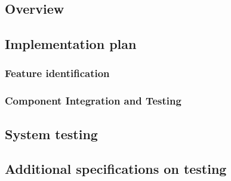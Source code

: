 \subsection{Overview}
\subsection{Implementation plan}
\subsubsection{Feature identification}
\subsubsection{Component Integration and Testing}
\subsection{System testing}
\subsection{Additional specifications on testing}
